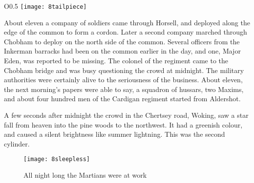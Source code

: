 \begin{wrapfigure}{O}{0.5\textwidth}
\centering
\texttt{[image: 8tailpiece]}
\end{wrapfigure}

About eleven a company of soldiers came through Horsell, and deployed along the edge of the common to form a cordon. Later a second company marched through Chobham to deploy on the north side of the common. Several officers from the Inkerman barracks had been on the common earlier in the day, and one, Major Eden, was reported to be missing. The colonel of the regiment came to the Chobham bridge and was busy questioning the crowd at midnight. The military authorities were certainly alive to the seriousness of the business. About eleven, the next morning's papers were able to say, a squadron of hussars, two Maxims, and about four hundred men of the Cardigan regiment started from Aldershot.



A few seconds after midnight the crowd in the Chertsey road, Woking, saw a star fall from heaven into the pine woods to the northwest. It had a greenish colour, and caused a silent brightness like summer lightning. This was the second cylinder.

\begin{figure}[tbph]
\centering
\texttt{[image: 8sleepless]}
\caption{All night long the Martians were at work}
\end{figure}

